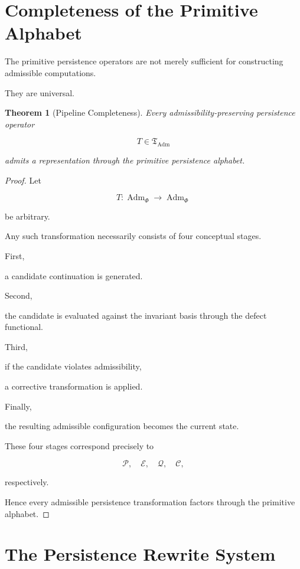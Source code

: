 \documentclass[11pt]{book}
\numberwithin{equation}{chapter}
\theoremstyle{definition}
\theoremstyle{plain}
\newtheorem{theorem}[definition]{Theorem}
\begin{document}
\section{Completeness of the Primitive Alphabet}

The primitive persistence operators are not merely sufficient for
constructing admissible computations.

They are universal.

\begin{theorem}[Pipeline Completeness]

Every admissibility-preserving persistence operator

\[
T
\in
\mathfrak T_{\operatorname{Adm}}
\]

admits a representation through the primitive persistence alphabet.

\end{theorem}

\begin{proof}

Let

\[
T
:
\operatorname{Adm}_{\Phi}
\rightarrow
\operatorname{Adm}_{\Phi}
\]

be arbitrary.

Any such transformation necessarily consists of four conceptual stages.

First,

a candidate continuation is generated.

Second,

the candidate is evaluated against the invariant basis through the defect
functional.

Third,

if the candidate violates admissibility,

a corrective transformation is applied.

Finally,

the resulting admissible configuration becomes the current state.

These four stages correspond precisely to

\[
\mathcal P,
\quad
\mathcal E,
\quad
\mathcal Q,
\quad
\mathcal C,
\]

respectively.

Hence every admissible persistence transformation factors through the
primitive alphabet.

\end{proof}

\section{The Persistence Rewrite System}
\end{document}

